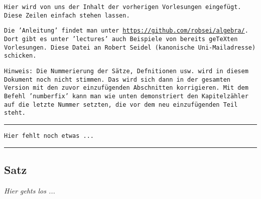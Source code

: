 \documentclass[11pt, a4paper, titlepage, bibliography=totoc]{scrbook}
\newcommand\numberfix[3]{
	\setcounter{chapter}{#1}
	\setcounter{section}{#2}
	\setcounter{subsection}{#3}
	
	\rule{\textwidth}{1pt}
	\texttt{Hier fehlt noch etwas ...}\\
	\rule{\textwidth}{1pt}
}
\begin{document}
\texttt{Hier wird von uns der Inhalt der vorherigen Vorlesungen eingefügt. Diese Zeilen einfach stehen lassen.}

\texttt{Die 'Anleitung' findet man unter \url{https://github.com/robsei/algebra/}. Dort gibt es unter 'lectures' auch Beispiele von bereits geTeXten Vorlesungen. Diese Datei an Robert Seidel (kanonische Uni-Mailadresse) schicken.}

\texttt{Hinweis: Die Nummerierung der Sätze, Defnitionen usw. wird in diesem Dokument noch nicht stimmen. Das wird sich dann in der gesamten Version mit den zuvor einzufügenden Abschnitten korrigieren. Mit dem Befehl 'numberfix' kann man wie unten demonstriert den Kapitelzähler auf die letzte Nummer setzten, die vor dem neu einzufügenden Teil steht.}

\numberfix{3}{1}{4}
\subsection{Satz} \textsl{Hier gehts los ...}
\end{document}
